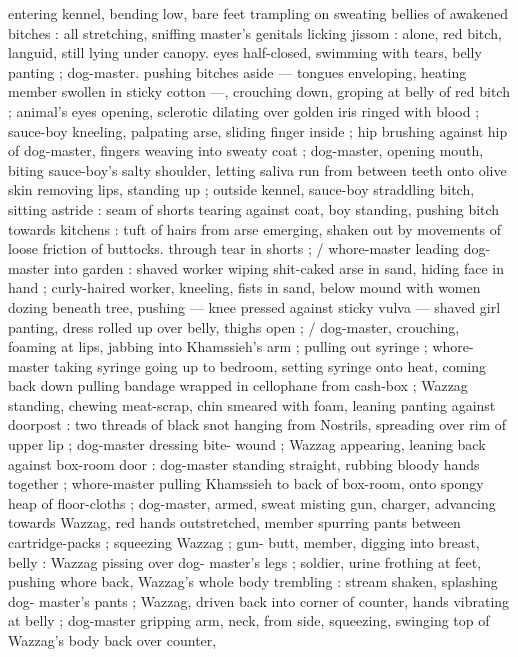 entering kennel, bending low, bare feet trampling on sweating bellies 
of awakened bitches : all stretching, sniffing master's genitals 
licking jissom : alone, red bitch, languid, still lying under canopy. 
eyes half-closed, swimming with tears, belly panting ; dog-master. 
pushing bitches aside --- tongues enveloping, heating member 
swollen in sticky cotton ---, crouching down, groping at belly of red 
bitch ; animal's eyes opening, sclerotic dilating over golden iris 
ringed with blood ; sauce-boy kneeling, palpating arse, sliding finger 
inside ; hip brushing against hip of dog-master, fingers weaving into 
sweaty coat ; dog-master, opening mouth, biting sauce-boy's salty 
shoulder, letting saliva run from between teeth onto olive skin 
removing lips, standing up ; outside kennel, sauce-boy straddling 
bitch, sitting astride : seam of shorts tearing against coat, boy 
standing, pushing bitch towards kitchens : tuft of hairs from arse 
emerging, shaken out by movements of loose friction of buttocks. 
through tear in shorts ; {\slash} whore-master leading dog-master into 
garden : shaved worker wiping shit-caked arse in sand, hiding face 
in hand ; curly-haired worker, kneeling, fists in sand, below mound 
with women dozing beneath tree, pushing --- knee pressed against 
sticky vulva --- shaved girl panting, dress rolled up over belly, thighs 
open ; {\slash} dog-master, crouching, foaming at lips, jabbing into 
Khamssieh's arm ; pulling out syringe ; whore-master taking syringe 
going up to bedroom, setting syringe onto heat, coming back down 
pulling bandage wrapped in cellophane from cash-box ; Wazzag 
standing, chewing meat-scrap, chin smeared with foam, leaning 
panting against doorpost : two threads of black snot hanging from 
Nostrils, spreading over rim of upper lip ; dog-master dressing bite- 
wound ; Wazzag appearing, leaning back against box-room door : 
dog-master standing straight, rubbing bloody hands together ; 
whore-master pulling Khamssieh to back of box-room, onto spongy 
heap of floor-cloths ; dog-master, armed, sweat misting gun, charger, 
advancing towards Wazzag, red hands outstretched, member 
spurring pants between cartridge-packs ; squeezing Wazzag ; gun- 
butt, member, digging into breast, belly : Wazzag pissing over dog- 
master's legs ; soldier, urine frothing at feet, pushing whore back, 
Wazzag's whole body trembling : stream shaken, splashing dog- 
master's pants ; Wazzag, driven back into corner of counter, hands 
vibrating at belly ; dog-master gripping arm, neck, from side, 
squeezing, swinging top of Wazzag's body back over counter, 
